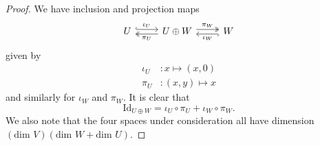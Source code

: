 \begin{proof}
We have inclusion and projection maps
\[
\begin{tikzcd}
U \arrow[r, hookrightarrow,  shift left,"\iota_{U}"]
& U \oplus W \arrow[r, twoheadrightarrow, shift left,"\pi_{W}"]
\arrow[l, twoheadrightarrow, shift left,"\pi_{U}"]
& W
\arrow[l, hookrightarrow, shift left, "\iota_{W}"]
\end{tikzcd}
 \]
 given by
\begin{align*}
 \iota_U &\colon x \mapsto (x , 0) \\
 \pi_U &\colon (x , y) \mapsto x
 \end{align*}
 and similarly for $\iota_W$ and $\pi_W$.  It is clear that
 \[ \text{Id}_{U \oplus W} = \iota_U \circ \pi_U + \iota_W \circ \pi_W. \]
We also note that the four spaces under consideration all have dimension $(\text{dim } V)(\text{dim } W + \text{dim } U)$.


\end{proof}
